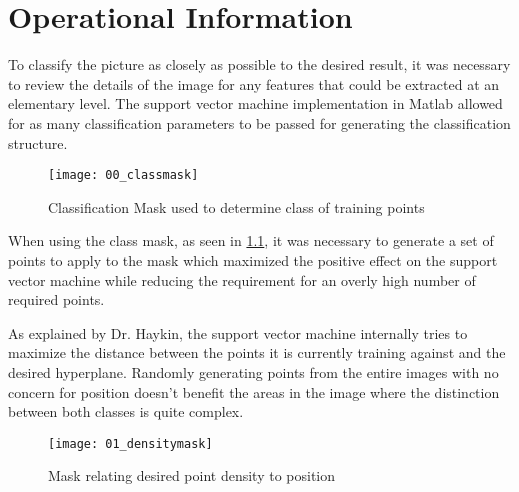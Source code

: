 \chapter{Operational Information}

To classify the picture as closely as possible to the desired result, it was necessary to review the details of the image for any features that could be extracted at an elementary level. The support vector machine implementation in Matlab allowed for as many classification parameters to be passed for generating the classification structure.


\begin{figure}[h]
    \centering
    \texttt{[image: 00\_classmask]}
    \caption{Classification Mask used to determine class of training points}
    \label{fig:00_classmask}
\end{figure}

When using the class mask, as seen in \ref{fig:00_classmask}, it was necessary to generate a set of points to apply to the mask which maximized the positive effect on the support vector machine while reducing the requirement for an overly high number of required points. 

As explained by Dr. Haykin, the support vector machine internally tries to maximize the distance between the points it is currently training against and the desired hyperplane. \citep[]{00_SimonHaykin} Randomly generating points from the entire images with no concern for position doesn't benefit the areas in the image where the distinction between both classes is quite complex.

\begin{figure}[h]
    \centering
    \texttt{[image: 01\_densitymask]}
    \caption{Mask relating desired point density to position}
    \label{fig:01_densitymask}
\end{figure}


